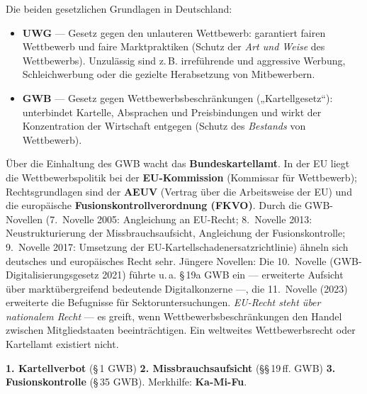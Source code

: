 \documentclass[11pt, a4paper]{article}
\begin{document}
Die beiden gesetzlichen Grundlagen in Deutschland:

\begin{itemize}
  \item \textbf{UWG} --- Gesetz gegen den unlauteren Wettbewerb: garantiert fairen
    Wettbewerb und faire Marktpraktiken (Schutz der \emph{Art und Weise} des Wettbewerbs).
    Unzulässig sind z.\,B. irreführende und aggressive Werbung, Schleichwerbung oder die
    gezielte Herabsetzung von Mitbewerbern.
  \item \textbf{GWB} --- Gesetz gegen Wettbewerbsbeschränkungen („Kartellgesetz``):
    unterbindet Kartelle, Absprachen und Preisbindungen und wirkt der Konzentration der
    Wirtschaft entgegen (Schutz des \emph{Bestands} von Wettbewerb).
\end{itemize}

Über die Einhaltung des GWB wacht das \textbf{Bundeskartellamt}. In der EU liegt die
Wettbewerbspolitik bei der \textbf{EU-Kommission} (Kommissar für Wettbewerb);
Rechtsgrundlagen sind der \textbf{AEUV} (Vertrag über die Arbeitsweise der EU) und die
europäische \textbf{Fusionskontrollverordnung (FKVO)}. Durch die GWB-Novellen (7.~Novelle
2005: Angleichung an EU-Recht; 8.~Novelle 2013: Neustrukturierung der Missbrauchsaufsicht,
Angleichung der Fusionskontrolle; 9.~Novelle 2017: Umsetzung der
EU-Kartellschadenersatzrichtlinie) ähneln sich deutsches und europäisches Recht sehr.
Jüngere Novellen: Die 10.~Novelle (GWB-Digitalisierungsgesetz 2021) führte u.\,a.
\S\,19a GWB ein --- erweiterte Aufsicht über marktübergreifend bedeutende
Digitalkonzerne ---, die 11.~Novelle (2023) erweiterte die Befugnisse für
Sektoruntersuchungen.
\emph{EU-Recht steht über nationalem Recht} --- es greift, wenn Wettbewerbsbeschränkungen
den Handel zwischen Mitgliedstaaten beeinträchtigen. Ein weltweites Wettbewerbsrecht oder
Kartellamt existiert nicht.

\begin{merksatz}[title={\bfseries Die drei Säulen des GWB}]
\textbf{1. Kartellverbot} (\S\,1 GWB) \quad \textbf{2. Missbrauchsaufsicht}
(\S\S\,19\,ff. GWB) \quad \textbf{3. Fusionskontrolle} (\S\,35 GWB).
Merkhilfe: \textbf{Ka-Mi-Fu}.
\end{merksatz}
\end{document}
